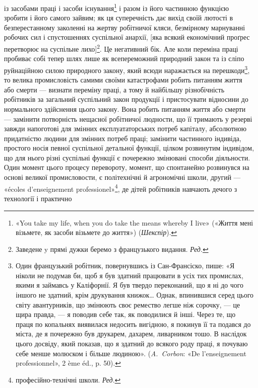 \parcont{}  %
із засобами праці і засоби існування\footnote{
«You take my life, when you do take the means whereby I live»
(«Життя мені візьмете, як засоби візьмете до життя») (\emph{Шекспір}).
} і разом із його частинною
функцією зробити і його самого зайвим; як ця суперечність дає
вихід своїй лютості в безперестанному заколенні на жертву
робітничої кляси, безмірному марнуванні робочих сил і спустошеннях
суспільної анархії, [яка всякий економічний проґрес
перетворює на суспільне лихо]\footnote*{
Заведене y прямі дужки беремо з французького видання. \emph{Ред.}
}.  Це негативний бік. Але коли
переміна праці пробиває собі тепер шлях лише як всепереможний
природний закон та із сліпо руйнаційною силою природного закону,
який всюди наражається на перешкоди\footnote{
Один французький робітник, повернувшись із Сан-Франсіско,
пише: «Я ніколи не подумав би, щоб я був здатний працювати в усіх
тих промислах, якими я займавсь у Каліфорнії. Я був твердо переконаний,
що я ні до чого іншого не здатний, крім друкування книжок\dots{} Однак,
впинившися серед цього світу авантурників, що змінюють своє ремество
легше ніж сорочку, — це щира правда, — я поводив себе так, як поводилися
й інші. Через те, що праця по копальнях виявилася недосить вигідною,
я покинув її та подався до міста, де я почережно був друкарем, дахарем,
ливарником тошо. В наслідок цього досвіду, який показав, що я здатний
до всякого роду праці, я почуваю себе менше молюском і більше людиною».
(\emph{A.~Corbon}: «De l’enseignement professionnel», 2 ème éd., p. 50).
}, то велика промисловість
самими своїми катастрофами робить питанням життя або
смерти — визнати переміну праці, а тому й найбільшу різнобічність
робітників за загальний суспільний закон продукції і
пристосувати відносини до нормального здійснення цього закону.
Вона робить питанням життя або смерти — замінити потворність
нещасної робітничої людности, що її тримають у резерві завжди
напоготові для змінних експлуататорських потреб капіталу,
абсолютною придатністю людини для змінних потреб праці;
замінити частинного індивіда, простого носія певної суспільної
детальної функції, цілком розвинутим індивідом, що для нього
різні суспільні функції є почережно змінювані способи діяльности.
Один момент цього процесу перевороту, момент, що спонтанейно
розвинувся на основі великої промисловости, є політехнічні й
агрономічні школи, другий — «écoles d’enseignement professionel»\footnote*{
професійно-технічні школи. \emph{Ред.}
},
де дітей робітників навчають дечого з технології і практично
